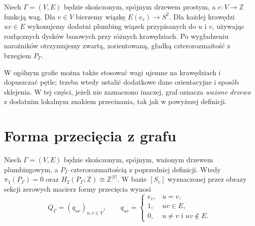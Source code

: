 \begin{definicja}
Niech $\Gamma=(V,E)$ będzie skończonym, spójnym drzewem
prostym, a $e\colon V\to\mathbb Z$ funkcją wag.
Dla $v\in V$ bierzemy wiązkę $E(e_v)\to S^2$.
Dla każdej krawędzi $uv\in E$ wykonujemy dodatni plumbing
wiązek przypisanych do $u$ i $v$, używając rozłącznych
dysków bazowych przy różnych krawędziach. Po wygładzeniu
narożników otrzymujemy zwartą, zorientowaną, gładką
czterorozmaitość z brzegiem $P_\Gamma$.
\end{definicja}

W ogólnym grafie można także stosować wagi ujemne na
krawędziach i dopuszczać pętle; trzeba wtedy ustalić dodatkowe
dane orientacyjne i sposób sklejenia. W tej części, jeżeli nie
zaznaczono inaczej, graf oznacza \emph{ważone drzewo} z dodatnim
lokalnym znakiem przecinania, tak jak w powyższej definicji.

\section{Forma przecięcia z grafu}
\label{sec:tg-plumbing-Q}

\begin{twierdzenie}
\label{thm:tg-plumbing-intersection}
Niech $\Gamma=(V,E)$ będzie skończonym, spójnym, ważonym
drzewem plumbingowym, a $P_\Gamma$ czterorozmaitością
z poprzedniej definicji. Wtedy $\pi_1(P_\Gamma)=0$ oraz
$H_2(P_\Gamma;\mathbb Z)\cong\mathbb Z^{|V|}$.
W bazie $[S_v]$ wyznaczonej przez obrazy sekcji zerowych
macierz formy przecięcia wynosi
\[
Q_\Gamma=(q_{uv})_{u,v\in V},\qquad
q_{uv}=\begin{cases}
e_v,&u=v,\\
1,&uv\in E,\\
0,&u\ne v\text{ i }uv\notin E.
\end{cases}
\]
\end{twierdzenie}

